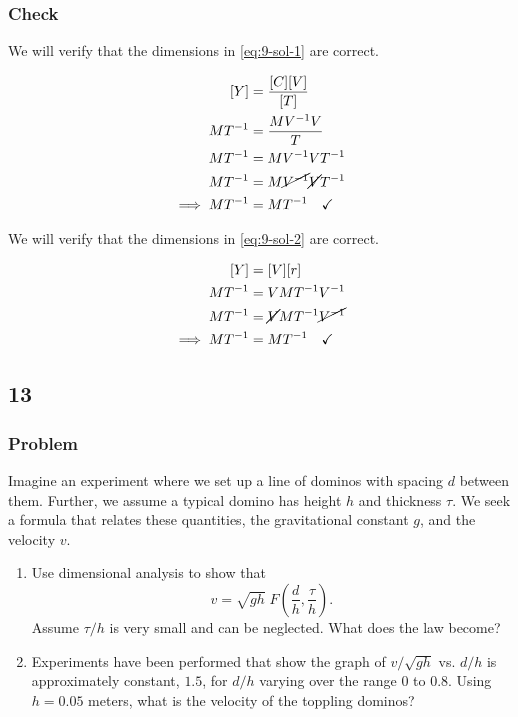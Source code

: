 \documentclass[12pt]{article}
\begin{document}
  \subsubsection*{Check}
  We will verify that the dimensions in \cref{eq:9-sol-1} are correct.

  \begin{equation}
    \begin{aligned}
      [Y] &= \frac{[C][V]}{[T]} \\
      MT^{-1} &= \frac{MV^{-1}V}{T} \\
      MT^{-1} &= MV^{-1}VT^{-1} \\
      MT^{-1} &= M\cancel{V^{-1}}\cancel{V}T^{-1} \\
      \implies MT^{-1} &= MT^{-1} \quad\checkmark \\
    \end{aligned}
  \end{equation}

  We will verify that the dimensions in \cref{eq:9-sol-2} are correct.

  \begin{equation}
    \begin{aligned}
      [Y] &= [V] [r] \\
      MT^{-1} &= V MT^{-1}V^{-1} \\
      MT^{-1} &= \cancel{V} MT^{-1} \cancel{V^{-1}} \\
      \implies MT^{-1} &= MT^{-1} \quad\checkmark \\
    \end{aligned}
  \end{equation}

  \newpage
  \subsection{13}
  \subsubsection*{Problem}
  Imagine an experiment where we set up a line of dominos with spacing $d$
  between them. Further, we assume a typical domino has height $h$ and thickness
  $\tau$. We seek a formula that relates these quantities, the gravitational
  constant $g$, and the velocity $v$.

  \begin{enumerate}
  \item Use dimensional analysis to show
    that
    \begin{equation}
      \label{eq:13-1-question}
      v=\sqrt{gh}\; F\left(\frac{d}{h},\frac{\tau}{h}\right).
    \end{equation}
    Assume $\tau/h$ is very small and can be neglected. What does the law become?
  \item Experiments have been performed that show the graph of $v/\sqrt{gh}$ vs.
    $d/h$ is approximately constant, $1.5$, for $d/h$ varying over the range $0$
    to $0.8$. Using $h=0.05$ meters, what is the velocity of the toppling dominos?
  \end{enumerate}
\end{document}
